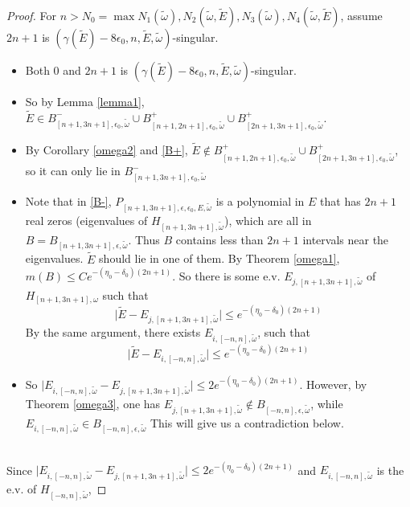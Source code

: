 \begin{proof}
For $n>N_0=\max{N_1(\tilde{\omega}),N_2(\tilde{\omega},\tilde{E}),N_3(\tilde{\omega}),N_4(\tilde{\omega},\tilde{E})}$, assume $2n+1$ is $(\gamma(\tilde{E})-8\epsilon_0,n,\tilde{E},\tilde{\omega})$-singular.
\begin{itemize}
  \item Both $0$ and $2n+1$ is $(\gamma(\tilde{E})-8\epsilon_0,n,\tilde{E},\tilde{\omega})$-singular.
  \item So by Lemma \ref{lemma1},  $\tilde{E}\in B_{[n+1,3n+1],\epsilon_0,\tilde{\omega}}^-\cup B_{[n+1,2n+1],\epsilon_0,\tilde{\omega}}^+\cup B_{[2n+1,3n+1],\epsilon_0,\tilde{\omega}}^+$.
  \item By Corollary \ref{omega2} and \eqref{B+}, $\tilde{E}\notin B_{[n+1,2n+1],\epsilon_0,\tilde{\omega}}^+\cup B_{[2n+1,3n+1],\epsilon_0,\tilde{\omega}}^+$, so it can only lie in $B_{[n+1,3n+1],\epsilon_0,\tilde{\omega}}^-$
  \item
   Note that in \eqref{B-}, $P_{[n+1,3n+1],\epsilon,\epsilon_0,E,\tilde{\omega}}$ is a polynomial in $E$ that has $2n+1$ real zeros (eigenvalues of $H_{[n+1,3n+1],\tilde{\omega}}$), which are all in $B=B_{[n+1,3n+1],\epsilon,\tilde{\omega}}$. Thus $B$ contains less than $2n+1$ intervals near the eigenvalues. $\tilde{E}$ should lie in one of them. By Theorem \ref{omega1}, $m(B)\leq Ce^{-(\eta_0-\delta_0)(2n+1)}$. So there is some e.v. $E_{j,[n+1,3n+1],\tilde{\omega}}$ of $H_{[n+1,3n+1],\omega}$ such that
   \[
   \vert\tilde{E}-E_{j,[n+1,3n+1],\tilde{\omega}}\vert\leq e^{-(\eta_0-\delta_0)(2n+1)}
   \]
  By the same argument, there exists $ E_{i,[-n,n],\tilde{\omega}}$, such that
   \[
   \vert\tilde{E}-E_{i,[-n,n],\tilde{\omega}}\vert\leq e^{-(\eta_0-\delta_0)(2n+1)}
   \]
   \item So $\vert E_{i,[-n,n],\tilde{\omega}}-E_{j,[n+1,3n+1],\tilde{\omega}}\vert\leq 2e^{-(\eta_0-\delta_0)(2n+1)}$. However, by Theorem \ref{omega3}, one has $E_{j,[n+1,3n+1],\tilde{\omega}}\notin B_{[-n,n],\epsilon,\tilde{\omega}}$, while $E_{i,[-n,n],\tilde{\omega}}\in B_{[-n,n],\epsilon,\tilde{\omega}}$
   This will give us a contradiction below.
\end{itemize}
~\\
Since $\vert E_{i,[-n,n],\tilde{\omega}}-E_{j,[n+1,3n+1],\tilde{\omega}}\vert\leq 2e^{-(\eta_0-\delta_0)(2n+1)}$ and $E_{i,[-n,n],\tilde{\omega}}$ is the e.v. of $H_{[-n,n],\tilde{\omega}}$,

\end{proof}
